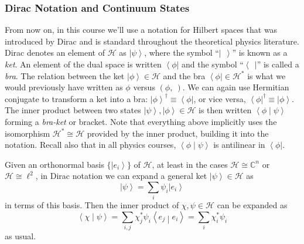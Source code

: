 \documentclass{article}
\theoremstyle{plain}\theoremheaderfont{\normalfont\itshape}\theorembodyfont{\rmfamily}\theoremseparator{.}\newtheorem*{rem}{Remark}\newtheorem*{ex}{Example}\newtheorem*{proof}{Proof}\newtheorem*{altp}{Alternative proof}
\theoremstyle{plain}\theoremheaderfont{\normalfont\bfseries}\theorembodyfont{\rmfamily}\theoremseparator{.}\newtheorem{thm}{Theorem}[section]\newtheorem{lem}[thm]{Lemma}\newtheorem{prop}[thm]{Proposition}\newtheorem*{cor}{Corollary}\newtheorem{defn}[thm]{Definition}\newtheorem{clm}[thm]{Claim}\newtheorem{clminproof}{Claim}
\theoremstyle{break}\theoremheaderfont{\normalfont\itshape}\theorembodyfont{\rmfamily}\theoremseparator{.\medskip}\newtheorem*{proofskip}{Proof}\newtheorem*{exs}{Examples}\newtheorem*{rems}{Remarks}
\theoremstyle{break}\theoremheaderfont{\normalfont\bfseries}\theorembodyfont{\rmfamily}\theoremseparator{.\medskip}\newtheorem{lemskip}[thm]{Lemma}\newtheorem{defnskip}[thm]{Definition}\newtheorem{propskip}[thm]{Proposition}\newtheorem{thmskip}[thm]{Theorem}
\numberwithin{equation}{section}
\newcommand{\bra}[1]{\left\langle #1 \right|}
\newcommand{\ket}[1]{\left| #1 \right\rangle}
\newcommand{\braket}[2]{\left\langle #1 \middle| #2 \right\rangle}
\newcommand{\hb}{\mathcal{H}}
\newcommand{\CC}{\mathbb{C}}
\begin{document}
    \subsubsection{Dirac Notation and Continuum States}
    From now on, in this course we'll use a notation for Hilbert spaces that was introduced by Dirac and is standard throughout the theoretical physics literature. Dirac denotes an element of \(\hb\) as \(\ket{\psi}\), where the symbol ``\(\ket{\ \ }\)'' is known as a \textit{ket}. An element of the dual space is written \(\bra{\phi}\) and the symbol ``\(\bra{\ \ }\)'' is called a \textit{bra}. The relation between the ket \(\ket{\phi}\in\hb\) and the bra \(\bra{\phi}\in\hb^*\) is what we would previously have written as \(\phi\) versus \((\phi,\ )\). We can again use Hermitian conjugate to transform a ket into a bra: \(\ket{\phi}^\dagger\equiv\bra{\phi}\), or vice versa, \(\bra{\phi}^\dagger\equiv\ket{\phi}\). The inner product between two states \(\ket{\psi},\ket{\phi}\in\hb\) is then written \(\braket{\phi}{\psi}\) forming a \textit{bra-ket} or bracket. Note that everything above implicitly uses the isomorphism \(\hb^*\cong\hb\) provided by the inner product, building it into the notation. Recall also that in all physics courses, \(\braket{\phi}{\psi}\) is antilinear in \(\bra{\phi}\).

    Given an orthonormal basis \(\{\ket{e_i}\}\) of \(\hb\), at least in the cases \(\hb\cong\CC^n\) or \(\hb\cong \ell^2\), in Dirac notation we can expand a general ket \(\ket{\psi}\in\hb\) as
    \begin{equation}\label{orthonormal_basis_expansion}
        \ket{\psi}=\sum_i \psi_i\ket{e_i}
    \end{equation}
    in terms of this basis. Then the inner product of \(\chi,\psi\in\hb\) can be expanded as
    \begin{equation}
        \braket{\chi}{\psi}=\sum_{i,j}\chi_j^*\psi_i\braket{e_j}{e_i}=\sum_i \chi_i^*\psi_i
    \end{equation}
    as usual.
\end{document}
